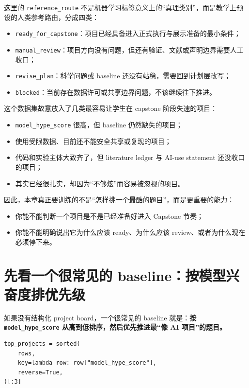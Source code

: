 这里的 \texttt{reference\_route} 不是机器学习标签意义上的“真理类别”，而是教学上预设的人类参考路由，分成四类：

\begin{itemize}
    \item \texttt{ready\_for\_capstone}：项目已经具备进入正式执行与展示准备的最小条件；
    \item \texttt{manual\_review}：项目方向没有问题，但还有验证、文献或声明边界需要人工收口；
    \item \texttt{revise\_plan}：科学问题或 baseline 还没有站稳，需要回到计划层改写；
    \item \texttt{blocked}：当前存在数据许可或共享边界问题，不该继续往下推进。
\end{itemize}

这个数据集故意放入了几类最容易让学生在 capstone 阶段失速的项目：

\begin{itemize}
    \item \texttt{model\_hype\_score} 很高，但 baseline 仍然缺失的项目；
    \item 使用受限数据、目前还不能安全共享或复现的项目；
    \item 代码和实验主体大致齐了，但 literature ledger 与 AI-use statement 还没收口的项目；
    \item 其实已经很扎实，却因为“不够炫”而容易被忽视的项目。
\end{itemize}

因此，本章真正要训练的不是“怎样挑一个最酷的题目”，而是更重要的能力：

\begin{itemize}
    \item 你能不能判断一个项目是不是已经准备好进入 Capstone 节奏；
    \item 你能不能明确说出它为什么应该 ready、为什么应该 review、或者为什么现在必须停下来。
\end{itemize}

\section{先看一个很常见的 baseline：按模型兴奋度排优先级}

如果没有结构化 project board，一个很常见的 baseline 就是：\textbf{按 \texttt{model\_hype\_score} 从高到低排序，然后优先推进最“像 AI 项目”的题目。}

\begin{examplebox}
\begin{lstlisting}[style=pythonstyle]
top_projects = sorted(
    rows,
    key=lambda row: row["model_hype_score"],
    reverse=True,
)[:3]
\end{lstlisting}
\end{examplebox}

